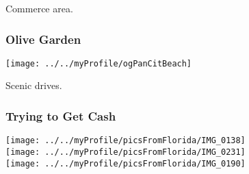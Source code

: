 


\begin{frame}[plain,c] 
\begin{center} 
\Huge Commerce area. 
\end{center} 
\end{frame} 

\begin{frame}[plain,c] 
\frametitle{Olive Garden} 
\begin{center} 
 \texttt{[image: ../../myProfile/ogPanCitBeach]} 
\end{center} 
\end{frame} 




\begin{frame}[plain,c]
\begin{center} 
\Huge Scenic drives.
\end{center}
\end{frame}




\begin{frame}[plain,c] 
\frametitle{Trying to Get Cash}
\begin{center}
\texttt{[image: ../../myProfile/picsFromFlorida/IMG\_0138]}\\

\texttt{[image: ../../myProfile/picsFromFlorida/IMG\_0231]}\\

\texttt{[image: ../../myProfile/picsFromFlorida/IMG\_0190]}\\
\end{center} 


\end{frame} 

